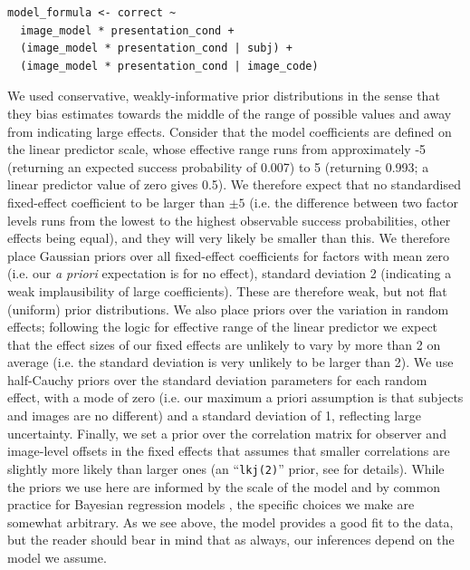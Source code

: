 \documentclass[article, 11pt,a4paper,natbib]{apa6}\usepackage[]{graphicx}\usepackage[]{color}
\begin{document}
\begin{small}
\begin{verbatim}
model_formula <- correct ~ 
  image_model * presentation_cond +
  (image_model * presentation_cond | subj) +
  (image_model * presentation_cond | image_code)
\end{verbatim}
\end{small}

We used conservative, weakly-informative prior distributions in the sense that they bias estimates towards the middle of the range of possible values and away from indicating large effects.
Consider that the model coefficients are defined on the linear predictor scale, whose effective range runs from approximately -5 (returning an expected success probability of 0.007) to 5 (returning 0.993; a linear predictor value of zero gives 0.5).
We therefore expect that no standardised fixed-effect coefficient to be larger than $\pm 5$ (i.e. the difference between two factor levels runs from the lowest to the highest observable success probabilities, other effects being equal), and they will very likely be smaller than this.
We therefore place Gaussian priors over all fixed-effect coefficients for factors with mean zero (i.e. our \textit{a priori} expectation is for no effect), standard deviation 2 (indicating a weak implausibility of large coefficients).
These are therefore weak, but not flat (uniform) prior distributions.
We also place priors over the variation in random effects; following the logic for effective range of the linear predictor we expect that the effect sizes of our fixed effects are unlikely to vary by more than 2 on average (i.e. the standard deviation is very unlikely to be larger than 2).
We use half-Cauchy priors \citep[i.e. with a lower-bound of zero, as recommended by][]{gelman_data_2007} over the standard deviation parameters for each random effect, with a mode of zero (i.e. our maximum a priori assumption is that subjects and images are no different) and a standard deviation of 1, reflecting large uncertainty.
Finally, we set a prior over the correlation matrix for observer and image-level offsets in the fixed effects that assumes that smaller correlations are slightly more likely than larger ones (an ``\texttt{lkj(2)}'' prior, see \citet{lewandowski_generating_2009, standevelopmentteam_stan_2015-1} for details).
While the priors we use here are informed by the scale of the model and by common practice for Bayesian regression models \citep[see for example][]{kruschke_doing_2011,gelman_prior_2006,gelman_data_2007}, the specific choices we make are somewhat arbitrary.
As we see above, the model provides a good fit to the data, but the reader should bear in mind that as always, our inferences depend on the model we assume.
\end{document}
